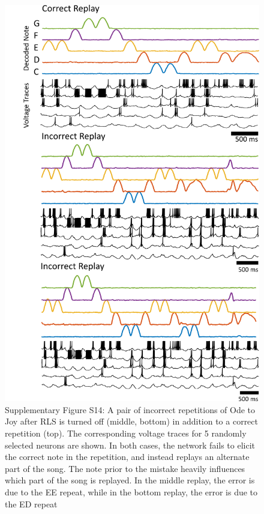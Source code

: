 \documentclass[11pt]{article} %
\begin{document}
\clearpage





 
\begin{figure}[htp!]
    \centering
\includegraphics[scale=0.86]{FFIGS15}
    \caption*{Supplementary Figure S14:  A pair of incorrect repetitions of Ode  to Joy after RLS is turned off (middle, bottom) in addition to a correct repetition (top). The corresponding voltage traces for 5 randomly selected neurons are shown. In both cases, the network fails to elicit the correct note in the repetition, and instead replays an alternate part of the song.  The note prior to the mistake heavily influences which part of the song is replayed.  In the middle replay, the error is due to the EE repeat, while in the bottom replay, the error is due to the ED repeat}\label{fig1}
\end{figure}
\end{document}
